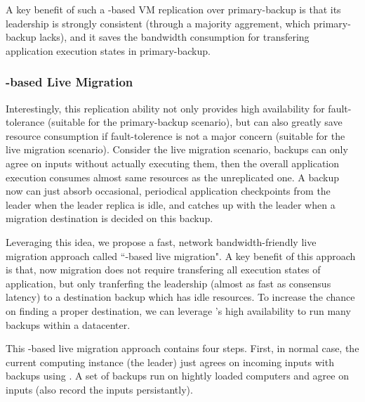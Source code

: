 A key benefit of such a \paxos-based VM replication over primary-backup is that 
its leadership is strongly consistent (through a majority aggrement, which 
primary-backup lacks), and it saves the bandwidth consumption for transfering 
application execution states in primary-backup.


\vspace{-.15in}\subsubsection{\paxos-based Live Migration} 
\label{sec:vm-migration}\vspace{-.075in}

Interestingly, this replication ability not only provides high 
availability for fault-tolerance (suitable for the primary-backup scenario), 
but can also greatly save resource consumption if fault-tolerence is not a 
major concern (suitable for the live migration scenario). Consider the live 
migration scenario, \paxos backups can only agree on inputs without actually 
executing them, then the overall application execution consumes almost same 
resources as the unreplicated one. A backup now can just absorb occasional, 
periodical application checkpoints from the leader when the leader replica is 
idle, and catches up with the leader when a migration destination is decided on 
this backup.

Leveraging this idea, we propose a fast, network bandwidth-friendly live 
migration approach called ``\paxos-based live migration". A key benefit of this 
approach is that, now migration does not require transfering all execution 
states of application, but only tranferfing the \paxos leadership (almost as 
fast as \paxos consensus latency) to a destination backup which has idle 
resources. To increase the chance on finding a proper destination, we can 
leverage \falcon's high availability to run many backups within a datacenter.

This \paxos-based live migration approach contains four steps. First, in 
normal case, the current computing instance (the leader) just agrees on 
incoming inputs with backups using \falcon. A set of backups run on hightly 
loaded computers and agree on inputs (also record the inputs persistantly). 

